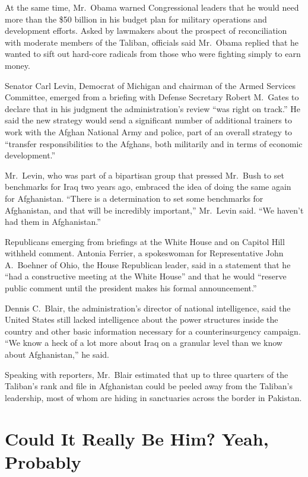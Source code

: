 \documentclass[12pt,a4paper,onecolumn]{article}
\begin{document}
\begin{CJK*}{GBK}{song}
At the same time, Mr.~Obama warned Congressional leaders that he would need more than the \$50
billion in his budget plan for military operations and development efforts. Asked by lawmakers about
the prospect of reconciliation with moderate members of the Taliban, officials said Mr.~Obama
replied that he wanted to sift out hard-core radicals from those who were fighting simply to earn
money.

Senator Carl Levin, Democrat of Michigan and chairman of the Armed Services Committee, emerged from
a briefing with Defense Secretary Robert M.~Gates to declare that in his judgment the
administration's review ``was right on track.'' He said the new strategy would send a significant
number of additional trainers to work with the Afghan National Army and police, part of an overall
strategy to ``transfer responsibilities to the Afghans, both militarily and in terms of economic
development.''

Mr.~Levin, who was part of a bipartisan group that pressed Mr.~Bush to set benchmarks for Iraq two
years ago, embraced the idea of doing the same again for Afghanistan. ``There is a determination to
set some benchmarks for Afghanistan, and that will be incredibly important,'' Mr.~Levin said. ``We
haven't had them in Afghanistan.''

Republicans emerging from briefings at the White House and on Capitol Hill withheld comment. Antonia
Ferrier, a spokeswoman for Representative John A.~Boehner of Ohio, the House Republican leader, said
in a statement that he ``had a constructive meeting at the White House'' and that he would ``reserve
public comment until the president makes his formal announcement.''

Dennis C.~Blair, the administration's director of national intelligence, said the United States
still lacked intelligence about the power structures inside the country and other basic information
necessary for a counterinsurgency campaign. ``We know a heck of a lot more about Iraq on a granular
level than we know about Afghanistan,'' he said.

Speaking with reporters, Mr.~Blair estimated that up to three quarters of the Taliban's rank and
file in Afghanistan could be peeled away from the Taliban's leadership, most of whom are hiding in sanctuaries across the border in Pakistan.

\section{Could It Really Be Him? Yeah, Probably}


\end{CJK*}
\end{document}
